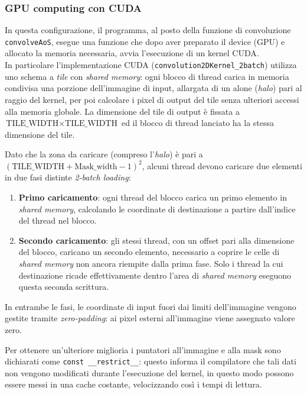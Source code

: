 \documentclass{article}
\newcommand{\code}[1]{\texttt{#1}}
\begin{document}
\subsubsection{GPU computing con CUDA}
In questa configurazione, il programma, al posto della funzione di convoluzione \code{convolveAoS}, esegue una funzione che dopo aver preparato il device (GPU) e allocato la memoria necessaria, avvia l'esecuzione di un kernel CUDA.\\
\noindent In particolare l'implementazione CUDA (\code{convolution2DKernel\_2batch}) utilizza uno schema a \textit{tile} con \textit{shared memory}: ogni blocco di thread carica in memoria condivisa una porzione dell'immagine di input, allargata di un alone (\textit{halo}) pari al raggio del kernel, per poi calcolare i pixel di output del tile senza ulteriori accessi alla memoria globale. La dimensione del tile di output è fissata a $\text{TILE\_WIDTH}\times\text{TILE\_WIDTH}$ ed il blocco di thread lanciato ha la stessa dimensione del tile.

\noindent Dato che la zona da caricare (compreso l'\textit{halo}) è pari a $(\text{TILE\_WIDTH} + \text{Mask\_width} - 1)^2$, alcuni thread devono caricare due elementi in due fasi distinte {\textit{2-batch loading}}:
\begin{enumerate}
    \item \textbf{Primo caricamento}: ogni thread del blocco carica un primo elemento in \textit{shared memory}, calcolando le coordinate di destinazione a partire dall'indice del thread nel blocco.
    \item \textbf{Secondo caricamento}: gli stessi thread, con un offset pari alla dimensione del blocco, caricano un secondo elemento, necessario a coprire le celle di \textit{shared memory} non ancora riempite dalla prima fase. Solo i thread la cui destinazione ricade effettivamente dentro l'area di \textit{shared memory} eseguono questa seconda scrittura.
\end{enumerate}
In entrambe le fasi, le coordinate di input fuori dai limiti dell'immagine vengono gestite tramite \textit{zero-padding}: ai pixel esterni all'immagine viene assegnato valore zero.

\noindent Per ottenere un'ulteriore miglioria i puntatori all'immagine e alla mask sono dichiarati come \code{const \_\_restrict\_\_}: questo informa il compilatore che tali dati non vengono modificati durante l'esecuzione del kernel, in questo modo possono essere messi in una cache costante, velocizzando così i tempi di lettura.
\end{document}
